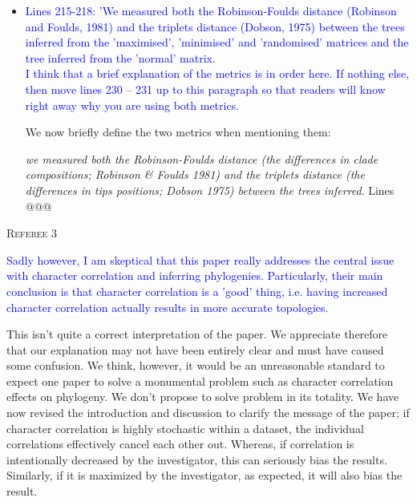 \documentclass[12pt,letterpaper]{article}
\renewcommand{\section}[1]{%
\bigskip
\begin{center}
\begin{Large}
\normalfont\scshape #1
\medskip
\end{Large}
\end{center}}
\begin{document}
\begin{itemize}
\item{\textcolor{blue}{Lines 215-218: 'We measured both the Robinson-Foulds distance (Robinson and Foulds, 1981) and the triplets distance (Dobson, 1975) between the trees inferred from the 'maximised', 'minimised' and 'randomised' matrices and the tree inferred from the 'normal' matrix.
\\
I think that a brief explanation of the metrics is in order here. If nothing else, then move lines 230 – 231 up to this paragraph so that readers will know right away why you are using both metrics.}}

We now briefly define the two metrics when mentioning them:

\textit{we measured both the Robinson-Foulds distance (the differences in clade compositions; Robinson \& Foulds 1981) and the triplets distance (the differences in tips positions; Dobson 1975) between the trees inferred}. Lines @@@

\end{itemize}
















\section{Referee 3}

\textcolor{blue}{Sadly however, I am skeptical that this paper really addresses the central issue with character correlation and inferring phylogenies. Particularly, their main conclusion is that character correlation is a 'good' thing, i.e. having increased character correlation actually results in more accurate topologies.} 

This isn't quite a correct interpretation of the paper. We appreciate therefore that our explanation may not have been entirely clear and must have caused some confusion. We think, however, it would be an unreasonable standard to expect one paper to solve a monumental problem such as character correlation effects on phylogeny. We don't propose to solve problem in its totality. We have now revised the introduction and discussion to clarify the message of the paper; if character correlation is highly stochastic within a dataset, the individual correlations effectively cancel each other out. Whereas, if correlation is intentionally decreased by the investigator, this can seriously bias the results. Similarly, if it is maximized by the investigator, as expected, it will also bias the result.
\end{document}
